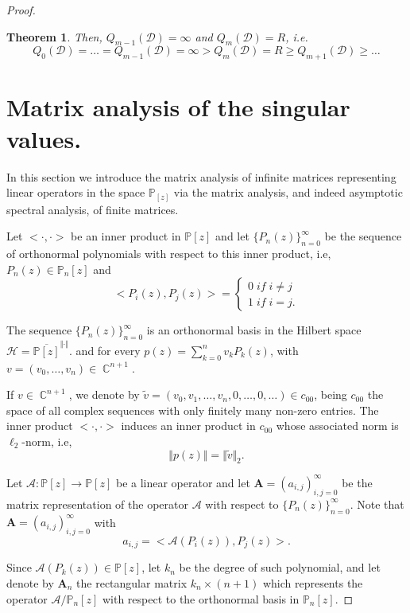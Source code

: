 \documentclass[12pt]{amsart}
\theoremstyle{definition}
\theoremstyle{plain}
\newtheorem{theorem}{Theorem}
\theoremstyle{remark}
\DeclareMathOperator{\CC}{\mathbb C}
\begin{document}
\begin{proof}
\begin{theorem}
\noindent Then, $Q_{m-1}(\mathcal{D})=\infty$ and $Q_{m}(\mathcal{D}) =R$, i.e. 
$$
Q_{0}(\mathcal{D})= \dots = Q_{m-1}(\mathcal{D})=\infty > Q_{m}(\mathcal{D}) =R \geq Q_{m+1}(\mathcal{D}) \geq \dots  
$$
\end{theorem}
\section{Matrix analysis of the singular values. }

\noindent In this section we introduce the matrix analysis of infinite matrices representing linear operators in the space $\mathbb{P}_[z]$ via the matrix analysis, and indeed asymptotic spectral analysis, of finite matrices. 


\noindent Let $<\cdot,\cdot>$ be an inner product in $\mathbb{P}[z]$ and let $\{P_n(z)\}_{n=0}^{\infty}$ be the sequence of orthonormal polynomials with respect to this inner product, i.e, $P_n(z)\in \mathbb{P}_n[z]$ and 
$$
<P_i(z),P_j(z)>=\begin{cases} 0 \; if \; i\neq j \\ 1 \; if \; i=j. \end{cases}
$$

\noindent The sequence $\{P_n(z)\}_{n=0}^{\infty}$ is an orthonormal basis in the Hilbert space $\mathcal{H}=\overline{\mathbb{P}[z]}^{\Vert \cdot \Vert}.
$ and for every 
  $p(z)=\sum_{k=0}^{n}v_kP_k(z)$, with $v=(v_0,\dots,v_n)\in \CC^{n+1}$.
  
  \noindent If $v\in \CC^{n+1}$, we  denote by 
 $\tilde{v}=(v_0,v_1,\dots,v_n,0,\dots,0,\dots)\in c_{00}$, being   $c_{00}$  the space
of all complex sequences with only finitely many non-zero entries.  The inner product $<\cdot,\cdot>$ induces an inner product in $c_{00}$ whose associated norm is $\ell_2$-norm, i.e, 
$$
\Vert p(z) \Vert= \Vert \tilde{v} \Vert_2.
$$



\medskip

\noindent Let $\mathcal{A}:\mathbb{P}[z]\to \mathbb{P}[z]$ be a linear operator and let $\mathbf{A} = (a_{i,j})_{i,j=0}^{\infty}$ be the matrix representation of the operator $\mathcal{A}$ with respect to $\{P_n(z)\}_{n=0}^{\infty}.$ Note that $\mathbf{A}=(a_{i,j})_{i,j=0}^{\infty}$ with  
$$
a_{i,j}= <\mathcal{A}(P_{i}(z)),P_j(z)>.
$$

\noindent Since $\mathcal{A}(P_k(z))\in \mathbb{P}[z]$, let $k_n$ be the degree of such polynomial, and let denote by $\mathbf{A}_n$ the rectangular matrix $k_n\times (n+1)$ which represents the operator $\mathcal{A}/\mathbb{P}_n[z]$ with respect to the orthonormal basis in $\mathbb{P}_n[z]$. 


\end{proof}
\end{document}
